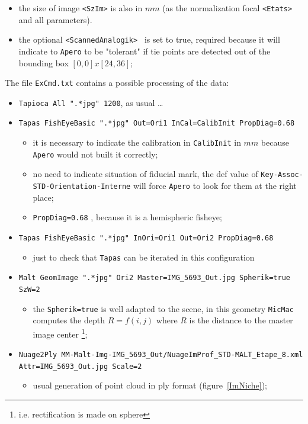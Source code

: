\begin{itemize}
    \item  the size of image {\tt <SzIm>} is also in $mm$ (as the normalization focal
            {\tt <Etats>}  and all parameters).
     \item  the optional {\tt  <ScannedAnalogik> } is set to true, required because
            it will indicate to {\tt Apero} to be "tolerant" if tie points are detected out
            of the bounding box $[0,0]x[24,36]$;
\end{itemize}

The file {\tt ExCmd.txt} contains a possible processing of the data:


\begin{itemize}
    \item {\tt Tapioca  All ".*jpg"  1200}, as usual \dots
    \item {\tt Tapas  FishEyeBasic  ".*jpg"  Out=Ori1 InCal=CalibInit PropDiag=0.68}

     \begin{itemize}
          \item  it is necessary to indicate the calibration in {\tt CalibInit} in $mm$ because {\tt Apero}
                 would not built it correctly;
          \item no need to indicate situation of fiducial mark, the def value of {\tt Key-Assoc-STD-Orientation-Interne}
                will force {\tt Apero} to look for them at the right place;
           \item {\tt PropDiag=0.68} , because it is a hemispheric fisheye;
      \end{itemize}

    \item {\tt Tapas FishEyeBasic ".*jpg" InOri=Ori1  Out=Ori2 PropDiag=0.68}
    \begin{itemize}
           \item  just to check that {\tt Tapas} can be iterated in  this  configuration
    \end{itemize}
    \item {\tt Malt GeomImage ".*jpg" Ori2 Master=IMG\_5693\_Out.jpg Spherik=true SzW=2}
    \begin{itemize}
             \item the {\tt Spherik=true} is well adapted  to the scene, in this geometry
                   {\tt MicMac} computes the depth  $R=f(i,j)$ where $R$ is the distance
                   to the master image center \footnote{i.e. rectification is made on sphere};
    \end{itemize}

    \item {\tt Nuage2Ply MM-Malt-Img-IMG\_5693\_Out/NuageImProf\_STD-MALT\_Etape\_8.xml Attr=IMG\_5693\_Out.jpg Scale=2}

    \begin{itemize}
             \item usual generation of point cloud in ply format (figure~\ref{ImNiche});
    \end{itemize}

\end{itemize}




